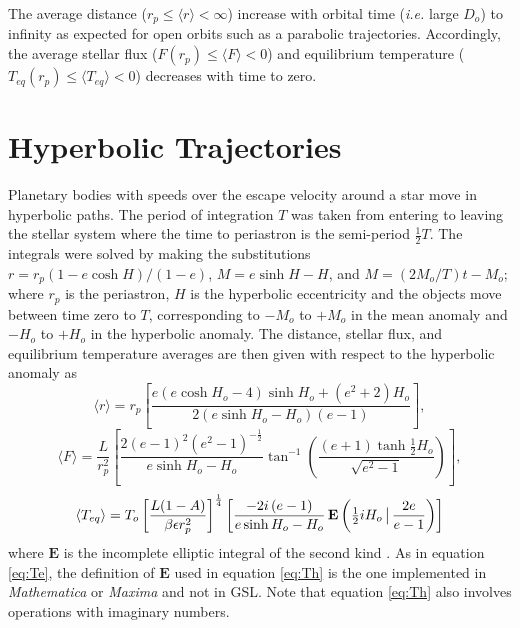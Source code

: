 \documentclass[a4paper,fleqn,usenatbib]{mnras}
\begin{document}
The average distance ($r_p \leq \langle r \rangle < \infty$) increase with orbital time (\emph{i.e.} large $D_o$) to infinity as expected for open orbits such as a parabolic trajectories. Accordingly, the average stellar flux ($F(r_p) \leq \langle F \rangle < 0$) and equilibrium temperature ($T_{eq}(r_p) \leq \langle T_{eq} \rangle < 0$) decreases with time to zero.


\section{Hyperbolic Trajectories}
\label{sec:hyperbolic}

Planetary bodies with speeds over the escape velocity around a star move in hyperbolic paths. The period of integration $T$ was taken from entering to leaving the stellar system where the time to periastron is the semi-period $\frac{1}{2}T$. The integrals were solved by making the substitutions $r=r_p(1-e\cosh{H})/(1-e)$, $M=e\sinh{H} - H$, and $M=(2M_o/T)t - M_o$; where $r_p$ is the periastron, $H$ is the hyperbolic eccentricity and the objects move between time zero to $T$, corresponding to $-M_o$ to $+M_o$ in the mean anomaly and $-H_o$ to $+H_o$ in the hyperbolic anomaly. The distance, stellar flux, and equilibrium temperature averages are then given with respect to the hyperbolic anomaly as
\begin{equation} \label{eq:rh}
\langle r \rangle = r_p \left[\frac{e \left(e \cosh{H_o} - 4\right) \sinh{H_o} + \left(e^{2} + 2\right) H_o}{2\left(e \sinh{H_o} - H_o\right) \left( e-1 \right) } \right],
\end{equation}
\begin{equation} \label{eq:Fh}
\langle F \rangle = \frac{L}{r_p^2} \left[ \frac{2 \left( e - 1 \right)^2 \left(e^2 - 1\right)^{-\frac{1}{2}}}{e \sinh{H_o} - H_o}\tan^{-1}\left({\frac{\left(e + 1\right) \tanh{\frac{1}{2}H_o}}{\sqrt{e^2 - 1}}}\right) \right],
\end{equation}
\begin{equation} \label{eq:Th}
\langle T_{eq} \rangle = T_o \left[\frac{L {\left(1 - A\right)}}{\beta \epsilon r_p^{2}}\right]^{\frac{1}{4}} \left[ \frac{-2 i \left(e-1\right)}{e \sinh{H_o} - H_o} \, {\rm \mathbf{E}}\left(\tfrac{1}{2}iH_o \, \big| \, \frac{2e}{e - 1}\right) \right]
\end{equation}
where $\mathbf{E}$ is the incomplete elliptic integral of the second kind \citep{MathWorld, GSL}. As in equation \ref{eq:Te}, the definition of $\mathbf{E}$ used in equation \ref{eq:Th} is the one implemented in \emph{Mathematica} or \emph{Maxima} and not in GSL. Note that equation \ref{eq:Th} also involves operations with imaginary numbers.
\end{document}
